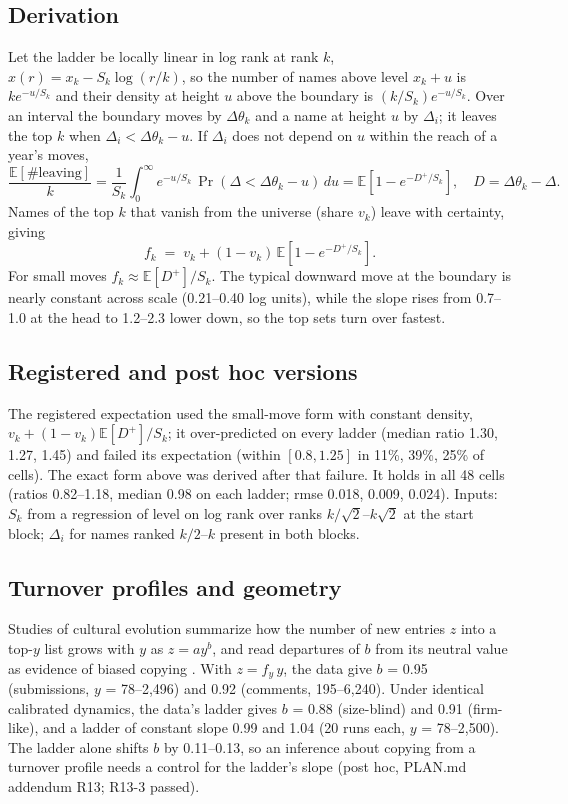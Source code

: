 \documentclass[10pt]{article}
\begin{document}
\subsection{Derivation}
Let the ladder be locally linear in log rank at rank $k$, $x(r) = x_k - S_k \log(r/k)$, so the number of names above level $x_k+u$ is $k e^{-u/S_k}$ and their density at height $u$ above the boundary is $(k/S_k)e^{-u/S_k}$. Over an interval the boundary moves by $\Delta\theta_k$ and a name at height $u$ by $\Delta_i$; it leaves the top $k$ when $\Delta_i < \Delta\theta_k - u$. If $\Delta_i$ does not depend on $u$ within the reach of a year's moves,
\begin{equation}
\frac{\mathbb{E}[\#\text{leaving}]}{k} = \frac{1}{S_k}\int_0^\infty e^{-u/S_k}\,\Pr(\Delta < \Delta\theta_k - u)\,du = \mathbb{E}\!\left[1-e^{-D^+/S_k}\right],\quad D = \Delta\theta_k - \Delta .
\end{equation}
Names of the top $k$ that vanish from the universe (share $v_k$) leave with certainty, giving
\begin{equation}
f_k \;=\; v_k + (1-v_k)\,\mathbb{E}\!\left[1-e^{-D^+/S_k}\right].
\label{eq:S_turnover}
\end{equation}
For small moves $f_k \approx \mathbb{E}[D^+]/S_k$. The typical downward move at the boundary is nearly constant across scale (0.21--0.40 log units), while the slope rises from 0.7--1.0 at the head to 1.2--2.3 lower down, so the top sets turn over fastest.
\subsection{Registered and post hoc versions}
The registered expectation used the small-move form with constant density, $v_k + (1-v_k)\mathbb{E}[D^+]/S_k$; it over-predicted on every ladder (median ratio 1.30, 1.27, 1.45) and failed its expectation (within $[0.8,1.25]$ in 11\%, 39\%, 25\% of cells). The exact form above was derived after that failure. It holds in all 48 cells (ratios 0.82--1.18, median 0.98 on each ladder; rmse 0.018, 0.009, 0.024). Inputs: $S_k$ from a regression of level on log rank over ranks $k/\sqrt2$--$k\sqrt2$ at the start block; $\Delta_i$ for names ranked $k/2$--$k$ present in both blocks.
\subsection{Turnover profiles and geometry}
Studies of cultural evolution summarize how the number of new entries $z$ into a top-$y$ list grows with $y$ as $z = a y^b$, and read departures of $b$ from its neutral value as evidence of biased copying \cite{bentley2007,acerbi2014,evans2011}. With $z = f_y\, y$, the data give $b$ = 0.95 (submissions, $y$ = 78--2,496) and 0.92 (comments, 195--6,240). Under identical calibrated dynamics, the data's ladder gives $b$ = 0.88 (size-blind) and 0.91 (firm-like), and a ladder of constant slope 0.99 and 1.04 (20 runs each, $y$ = 78--2,500). The ladder alone shifts $b$ by 0.11--0.13, so an inference about copying from a turnover profile needs a control for the ladder's slope (post hoc, PLAN.md addendum R13; R13-3 passed).
\end{document}
